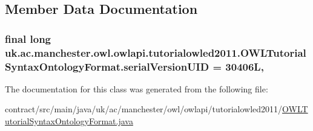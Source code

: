 \subsection{Member Data Documentation}
\hypertarget{classuk_1_1ac_1_1manchester_1_1owl_1_1owlapi_1_1tutorialowled2011_1_1_o_w_l_tutorial_syntax_ontology_format_a1f0941172373d594e0d78099d6c758eb}{
\subsubsection[{serial\-Version\-U\-I\-D}]{\setlength{\rightskip}{0pt plus 5cm}final long uk.\-ac.\-manchester.\-owl.\-owlapi.\-tutorialowled2011.\-O\-W\-L\-Tutorial\-Syntax\-Ontology\-Format.\-serial\-Version\-U\-I\-D = 30406\-L\hspace{0.3cm}{\ttfamily [static]}, {\ttfamily [private]}}}\label{classuk_1_1ac_1_1manchester_1_1owl_1_1owlapi_1_1tutorialowled2011_1_1_o_w_l_tutorial_syntax_ontology_format_a1f0941172373d594e0d78099d6c758eb}


The documentation for this class was generated from the following file\-:\begin{DoxyCompactItemize}
\item 
contract/src/main/java/uk/ac/manchester/owl/owlapi/tutorialowled2011/\hyperlink{main_2java_2uk_2ac_2manchester_2owl_2owlapi_2tutorialowled2011_2_o_w_l_tutorial_syntax_ontology_format_8java}{O\-W\-L\-Tutorial\-Syntax\-Ontology\-Format.\-java}\end{DoxyCompactItemize}
